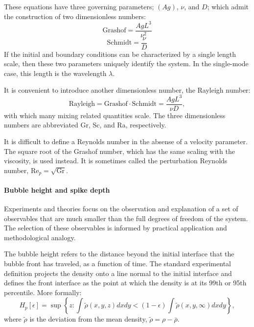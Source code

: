 These equations have three governing parameters; $(Ag)$, $\nu$, and $D$; which admit the construction of two dimensionless numbers:
\begin{equation}
\text{Grashof} = \frac{Ag L^3}{\nu^2}
\end{equation}
\begin{equation}
\text{Schmidt} = \frac{\nu}{D}
\end{equation}
If the initial and boundary conditions can be characterized by a single length scale, then these two parameters uniquely identify the system.
In the single-mode case, this length is the wavelength $\lambda$.

It is convenient to introduce another dimensionless number, the Rayleigh number:
\begin{equation}
\text{Rayleigh} = \text{Grashof} \cdot \text{Schmidt} = \frac{A g L^3}{\nu D},
\end{equation}
with which many mixing related quantities scale.
The three dimensionless numbers are abbreviated Gr, Sc, and Ra, respectively.

It is difficult to define a Reynolds number in the absense of a velocity parameter.
The square root of the Grashof number, which has the same scaling with the viscosity, is used instead.
It is sometimes called the perturbation Reynolds number, $\text{Re}_p = \sqrt{\text{Gr}}$.

\paragraph{Bubble height and spike depth}

Experiments and theories focus on the observation and explanation of a set of observables that are much smaller than the full degrees of freedom of the system.
The selection of these observables is informed by practical application and methodological analogy.

The bubble height refers to the distance beyond the initial interface that the bubble front has traveled, as a function of time.
The standard experimental definition projects the density onto a line normal to the initial interface and defines the front interface as the point at which the density is at its 99th or 95th percentile.
More formally:
\begin{equation}
H_p[\epsilon] = \sup \left\{z : \int \tilde\rho(x,y,z) dx dy < (1-\epsilon) \int \tilde\rho(x,y,\infty) dx dy \right\},
\end{equation}
where $\tilde\rho$ is the deviation from the mean density, $\tilde\rho = \rho - \bar\rho$.

